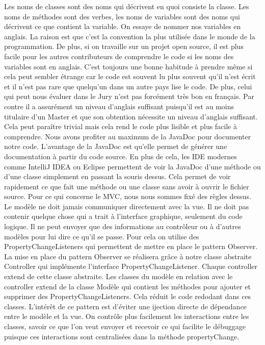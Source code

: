 \documentclass{article}
\begin{document}
    Les noms de classes sont des noms qui décrivent en quoi consiste la classe.
    Les noms de méthodes sont des verbes, les noms de variables sont des noms qui décrivent ce que contient la variable.
    On essaye de nommer nos variables en anglais. La raison est que c'est la convention la plus utilisée dans le monde de la programmation.
    De plus, si on travaille sur un projet open source, il est plus facile pour les autres contributeurs de comprendre le code si les noms des variables sont en anglais.
    C'est toujours une bonne habitude à prendre même si cela peut sembler étrange car le code est souvent lu plus souvent qu'il n'est écrit et il n'est pas rare que quelqu'un dans un autre pays lise le code.
    De plus, celui qui peut nous évaluer dans le Jury n'est pas forcément très bon en français.
    Par contre il a assurément un niveau d'anglais suffisant puisqu'il est au moins titulaire d'un Master et que son obtention nécessite un niveau d'anglais suffisant.
    Cela peut paraître trivial mais cela rend le code plus lisible et plus facile à comprendre.
    Nous avons profiter au maximum de la JavaDoc pour documenter notre code.
    L'avantage de la JavaDoc est qu'elle permet de générer une documentation à partir du code source.
    En plus de cela, les IDE modernes comme IntelliJ IDEA ou Eclipse permettent de voir la JavaDoc d'une méthode ou d'une classe simplement en passant la souris dessus.
    Cela permet de voir rapidement ce que fait une méthode ou une classe sans avoir à ouvrir le fichier source.
    \newline
    Pour ce qui concerne le MVC, nous nous sommes fixé des règles dessus.
    Le modèle ne doit jamais communiquer directement avec la vue.
    Il ne doit pas contenir quelque chose qui a trait à l'interface graphique, seulement du code logique.
    Il ne peut envoyer que des informations au contrôleur ou à d'autres modèles pour lui dire ce qu'il se passe.
    Pour cela on utilise des PropertyChangeListeners qui permettent de mettre en place le pattern Observer.
    La mise en place du pattern Observer se réalisera grâce à notre classe abstraite Controller qui implémente l'interface PropertyChangeListener.
    Chaque controller extend de cette classe abstraite. Les classes du modèle en relation avec le controller extend de la classe Modèle qui contient les méthodes pour ajouter et supprimer des PropertyChangeListeners.
    Cela réduit le code redodant dans ces classes. L'intérêt de ce pattern est d'éviter une ijection directe de dépendance entre le modèle et la vue.
    On contrôle plus facilement les interactions entre les classes, savoir ce que l'on veut envoyer et recevoir ce qui facilite le débuggage puisque ces interactions sont centralisées dans la méthode propertyChange.
\end{document}
